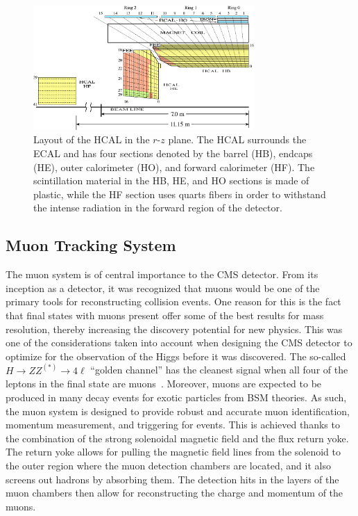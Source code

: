 \begin{figure}[htbp]
  \centering
  \includegraphics[width=0.75\textwidth]{fig/experiment/HCAL-HB-HE-HO-HF.pdf}
  \caption{
    Layout of the HCAL in the $r$-$z$ plane.
    The HCAL surrounds the ECAL and has four sections denoted by the barrel (HB), endcaps (HE), outer calorimeter (HO), and forward calorimeter (HF).
    The scintillation material in the HB, HE, and HO sections is made of plastic, while the HF section uses quarts fibers in order to withstand the intense radiation in the forward region of the detector.
  }
  \label{fig:CMSHCAL}
\end{figure}

\subsection{Muon Tracking System}
\label{subsec:muonTrack}

The muon system is of central importance to the CMS detector.
From its inception as a detector, it was recognized that muons would be one of the primary tools for reconstructing collision events.
One reason for this is the fact that final states with muons present offer some of the best results for mass resolution, thereby increasing the discovery potential for new physics.
This was one of the considerations taken into account when designing the CMS detector to optimize for the observation of the Higgs before it was discovered.
The so-called $H\to ZZ^{(*)}\to 4\ell$ ``golden channel'' has the cleanest signal when all four of the leptons in the final state are muons~\cite{Gainer_2011}.
Moreover, muons are expected to be produced in many decay events for exotic particles from BSM theories.
As such, the muon system is designed to provide robust and accurate muon identification, momentum measurement, and triggering for events.
This is achieved thanks to the combination of the strong solenoidal magnetic field and the flux return yoke.
The return yoke allows for pulling the magnetic field lines from the solenoid to the outer region where the muon detection chambers are located, and it also screens out hadrons by absorbing them.
The detection hits in the layers of the muon chambers then allow for reconstructing the charge and momentum of the muons.

